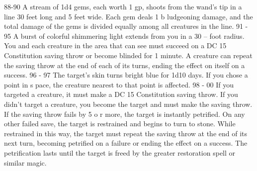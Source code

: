 88-90                                             A stream of 1d4  gems, each worth 1 gp,  shoots from the wand's tip in a line 30 feet long  and 5 feet wide. Each gem deals 1 b ludgeoning  damage, and the total damage of the gems is                                                                                                                                                                                                                                                                                                                                                                                                                             
divided equally among all creatures in the line.  
91 - 95                                           A burst of colorful shimmering light extends  from you in a 30 -- foot radius. You and each  creature in the area that can see must succeed  on a DC 15   Constitution saving throw or become  blinded for 1 minute. A creature can repeat the  saving throw at the end of each of its turns,  ending the effect on itself on a success.                                                                                                                                                                                                                                                                                
96 - 97                                           The target's skin turns bright blue for 1d10 days.  If you chose a point in s pace, the creature  nearest to that point is affected.                                                                                                                                                                                                                                                                                                                                                                                                                                                                                    
98 - 00                                           If you targeted a creature, it must make a DC 15  Constitution saving throw. If you didn't target a  creature, you become the target and must make  the saving throw. If the saving throw fails by 5 o r  more, the target is instantly petrified. On any  other failed save, the target is restrained and  begins to turn to stone. While restrained in this  way, the target must repeat the saving throw at  the end of its next turn, becoming petrified on a  failure or   ending the effect on a success. The  petrification lasts until the target is freed by the  greater restoration spell or similar magic. 